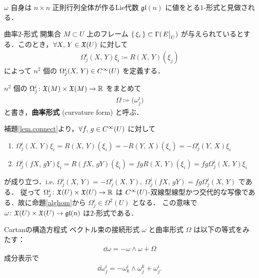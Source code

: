 \documentclass[geometry_main]{subfiles}
\begin{document}
\begin{marker} 
	$\omega$ 自身は $n\times n$ 正則行列全体が作るLie代数 $\mathfrak{gl}(n)$ に値をとる$1$-形式と見做される．
\end{marker}

\begin{mydef}[label=def.form_curvature]{曲率$2$-形式}
	開集合 $M \subset U$ 上のフレーム $\{\, \xi_i\, \} \subset \Gamma(\eval{E}_U)$ が与えられているとする．このとき，$\forall X,\, Y \in \mathfrak{X}(U)$ に対して
	\begin{align} 
		\Omega^i_j(X,\, Y) \xi_i \coloneqq R(X,\, Y)(\xi_j )
	\end{align}
	によって $n^2$ 個の $\Omega^i_j(X,\, Y) \in C^\infty(U)$ を定義する．
	
	$n^2$ 個の $\Omega^i_j \colon \mathfrak{X}(M) \times \mathfrak{X}(M) \to \mathbb{R}$ をまとめて
	\begin{align} 
		\Omega \coloneqq \bigl( \omega^i_j \bigr) 
	\end{align}
	と書き，\textbf{曲率形式} (curvature form) と呼ぶ．
\end{mydef}

補題\ref{lem.connect}より，$\forall f,\, g \in C^\infty(U)$ に対して
\begin{enumerate} 
	\item 
	$\Omega^i_j(X,\, Y) \xi_i = R(X,\, Y)(\xi_i) = -R(Y,\, X)(\xi_i) = -\Omega^i_j(Y,\, X)\xi_i$
	\item 
	$\Omega^i_j(fX,\, gY) \xi_i = R(fX,\, gY)(\xi_i) = fg R(X,\, Y)(\xi_i) = fg \Omega^i_j(X,\, Y)\xi_i$
\end{enumerate}
が成り立つ．i.e. $\Omega^i_j (X,\, Y) = -\Omega^i_j (X,\, Y),\; \Omega^i_j(fX,\, gY) = fg \Omega^i_j(X,\, Y)$ である．
従って $\Omega^i_j \colon \mathfrak{X}(U) \times \mathfrak{X}(U) \to \mathbb{R}$ は $C^\infty(U)$-双線型線型かつ交代的な写像である．故に命題\ref{alghom}から $\Omega^i_j \in \Omega^2(U)$ となる．
この意味で $\omega	\colon \mathfrak{X}(U) \times \mathfrak{X}(U) \to \mathfrak{gl}(n)$ は$2$-形式である．



\begin{mytheo}[label=eq.structure1]{Cartanの構造方程式}
	ベクトル束の接続形式 $\omega$ と曲率形式 $\Omega$ は以下の等式をみたす：
	\begin{align} 
		\dd{\omega} = - \omega \wedge \omega + \Omega
	\end{align}
	成分表示で
	\begin{align} 
		\dd{\omega^i_j} = - \omega^i_k \wedge \omega^k_j + \omega^i_j.
	\end{align}
\end{mytheo}
\end{document}
